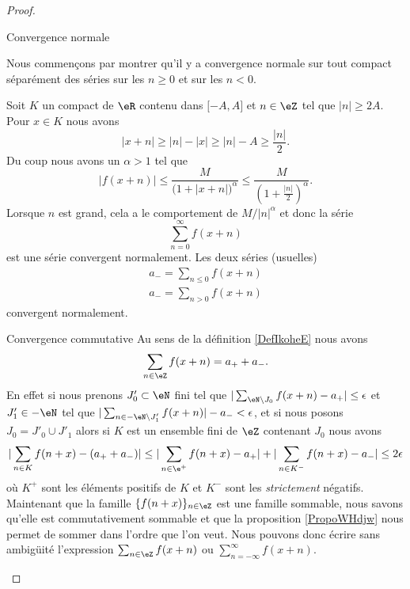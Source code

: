 \begin{proof}
    \begin{subproof}
        \item[Convergence normale]
    
    Nous commençons par montrer qu'il y a convergence normale sur tout compact séparément des séries sur les \( n\geq 0\) et sur les \( n<0\).
    
    Soit \( K\) un compact de \( \eR\) contenu dans \( \mathopen[ -A , A \mathclose]\) et \( n\in \eZ\) tel que \( | n |\geq 2A\). Pour \( x\in K\) nous avons
    \begin{equation}
        | x+n |\geq | n |-| x |\geq | n |-A\geq \frac{ | n | }{ 2 }.
    \end{equation}
    Du coup nous avons un \( \alpha>1\) tel que
    \begin{equation}
        | f(x+n) |\leq \frac{ M }{ \big( 1+| x+n | \big)^{\alpha} }\leq \frac{ M }{ \left( 1+\frac{ | n | }{2} \right)^{\alpha} }.
    \end{equation}
    Lorsque \( n\) est grand, cela a le comportement de \( M/| n |^{\alpha}\) et donc la série
    \begin{equation}
        \sum_{n=0}^{\infty}f(x+n)
    \end{equation}
    est une série convergent normalement. Les deux séries (usuelles) 
    \begin{subequations}
        \begin{align}
            a_-=\sum_{n\leq 0}f(x+n)\\
            a_-=\sum_{n> 0}f(x+n)
        \end{align}
    \end{subequations}
    convergent normalement.
    
\item[Convergence commutative]
    Au sens de la définition \ref{DefIkoheE} nous avons
    \begin{equation}
        \sum_{n\in \eZ}f(x+n)=a_++a_-.
    \end{equation}
    En effet si nous prenons \( J'_0\subset\eN\) fini tel que \( |\sum_{\eN\setminus J_0}f(x+n)-a_+|\leq \epsilon\) et \( J'_1\in -\eN\) tel que \( |\sum_{n\in -\eN\setminus J'_1}f(x+n)|-a_-<\epsilon\), et si nous posons \( J_0=J'_0\cup J'_1\) alors si \( K\) est un ensemble fini de \( \eZ\) contenant \( J_0\) nous avons
    \begin{equation}
        | \sum_{n\in K}f(n+x)-(a_++a_-) |\leq | \sum_{n\in \e^+}f(n+x)-a_+ |+| \sum_{n\in K^-}f(n+x)-a_- |\leq 2\epsilon
    \end{equation}
    où $K^+$ sont les éléments positifs de \(K\) et \( K^-\) sont les \emph{strictement} négatifs. Maintenant que la famille \( \{ f(n+x) \}_{n\in \eZ}\) est une famille sommable, nous savons qu'elle est commutativement sommable et que la proposition \ref{PropoWHdjw} nous permet de sommer dans l'ordre que l'on veut. Nous pouvons donc écrire sans ambigüité l'expression \( \sum_{n\in \eZ}f(x+n)\) ou \( \sum_{n=-\infty}^{\infty}f(x+n)\).
    

\end{subproof}
\end{proof}
